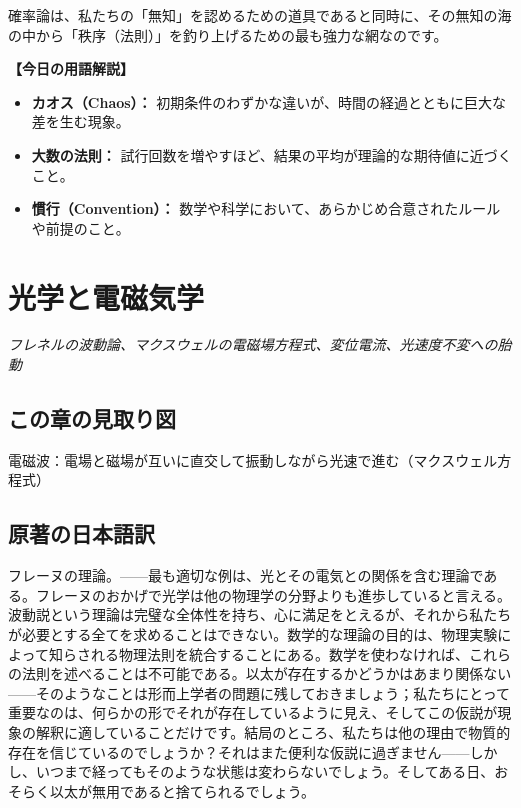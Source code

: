 \documentclass[a4paper,11pt,openany]{ltjsbook}
\begin{document}
\begin{lecturebox}
確率論は、私たちの「無知」を認めるための道具であると同時に、その無知の海の中から「秩序（法則）」を釣り上げるための最も強力な網なのです。

\textbf{【今日の用語解説】}
\begin{itemize}[leftmargin=2em]
\item \textbf{カオス（Chaos）：} 初期条件のわずかな違いが、時間の経過とともに巨大な差を生む現象。
\item \textbf{大数の法則：} 試行回数を増やすほど、結果の平均が理論的な期待値に近づくこと。
\item \textbf{慣行（Convention）：} 数学や科学において、あらかじめ合意されたルールや前提のこと。
\end{itemize}
\end{lecturebox}


\clearpage
\chapter{光学と電磁気学}
\begin{center}\large\textit{フレネルの波動論、マクスウェルの電磁場方程式、変位電流、光速度不変への胎動}\end{center}

\section*{この章の見取り図}
\begin{center}


\small 電磁波：電場と磁場が互いに直交して振動しながら光速で進む（マクスウェル方程式）
\end{center}

\section{原著の日本語訳}
フレーヌの理論。——最も適切な例は、光とその電気との関係を含む理論である。フレーヌのおかげで光学は他の物理学の分野よりも進歩していると言える。波動説という理論は完璧な全体性を持ち、心に満足をとえるが、それから私たちが必要とする全てを求めることはできない。数学的な理論の目的は、物理実験によって知らされる物理法則を統合することにある。数学を使わなければ、これらの法則を述べることは不可能である。以太が存在するかどうかはあまり関係ない——そのようなことは形而上学者の問題に残しておきましょう；私たちにとって重要なのは、何らかの形でそれが存在しているように見え、そしてこの仮説が現象の解釈に適していることだけです。結局のところ、私たちは他の理由で物質的存在を信じているのでしょうか？それはまた便利な仮説に過ぎません——しかし、いつまで経ってもそのような状態は変わらないでしょう。そしてある日、おそらく以太が無用であると捨てられるでしょう。
\end{document}
